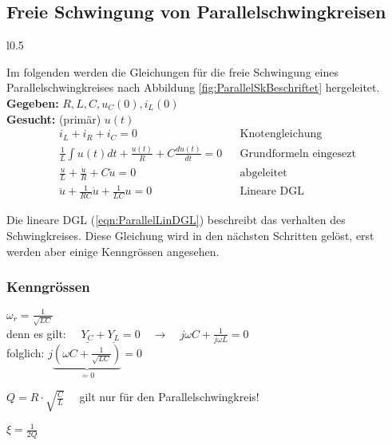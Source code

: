 \subsection{Freie Schwingung von Parallelschwingkreisen}
\begin{wrapfigure}{l}{0.5\textwidth}
	\centering
	
	\caption{Parallelschwingkreis}
	\label{fig:ParallelSkBeschriftet}
\end{wrapfigure}
Im folgenden werden die Gleichungen für die freie Schwingung eines
Parallelschwingkreises nach Abbildung \ref{fig:ParallelSkBeschriftet}
hergeleitet.
\\

\textbf{Gegeben:} $R,L,C, u_C(0), i_L(0)$\\

\textbf{Gesucht:} (primär) $u(t)$ \\

\begin{align}
 i_L + i_R + i_C = 0 
 && \text{Knotengleichung} \nonumber\\
 \frac{1}{L}\int{u(t)}dt + \frac{u(t)}{R} + C \frac{du(t)}{dt} = 0 
 && \text{Grundformeln eingesezt} \nonumber\\
 \frac{u}{L} + \frac{\dot{u}}{R} + C \ddot{u} = 0
 && \text{abgeleitet} \nonumber \\
 \boxed{\ddot{u} + \frac{1}{RC}\dot{u} + \frac{1}{LC}u = 0}
 && \text{Lineare DGL} \label{eqn:ParallelLinDGL}
\end{align}

Die lineare DGL (\ref{eqn:ParallelLinDGL}) beschreibt das verhalten des
Schwingkreises. Diese Gleichung wird in den nächsten Schritten gelöst, erst
werden aber einige Kenngrössen angesehen.

\subsubsection{Kenngrössen}
\begin{description}
[style=multiline,topsep=0pt,leftmargin=4.5cm,rightmargin=2cm]
\item[Resonanzfrequenz]
	$\omega_r = \frac{1}{\sqrt{LC}} $\\
	denn es gilt:
	$\quad \underline{Y_C} + \underline{Y_L} = 0  \quad \rightarrow \quad j
	\omega C + \frac{1}{j \omega L} = 0$ \\
	folglich: $j\underbrace{(\omega C + \frac{1}{\sqrt{LC}})}_{=0} = 0$
\item[Güte Q] 
	$Q = R \cdot \sqrt{\frac{C}{L}} \quad$ gilt nur für den
	Parallelschwingkreis!
\item[Dämpfungsgrad $\xi$]
	$\xi = \frac{1}{2Q}$
\end{description}


